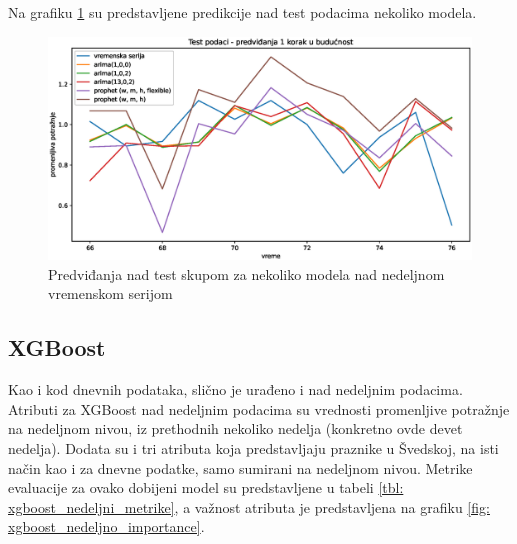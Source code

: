 \documentclass[12pt,oneside]{memoir}
\begin{document}
Na grafiku \ref{fig: nedeljni_test} su predstavljene predikcije nad test podacima nekoliko modela.
\begin{figure}[!ht]
  \centering
  \includegraphics[width=1\textwidth]{./grafici/test_nedeljni_modeli.eps}
  \caption{Predviđanja nad test skupom za nekoliko modela nad nedeljnom vremenskom serijom}
  \label{fig: nedeljni_test}
\end{figure}

\subsection{XGBoost}
Kao i kod dnevnih podataka, slično je urađeno i nad nedeljnim podacima. Atributi za XGBoost nad nedeljnim podacima su vrednosti promenljive potražnje na nedeljnom nivou, iz prethodnih nekoliko nedelja (konkretno ovde devet nedelja). Dodata su i tri atributa koja predstavljaju praznike u Švedskoj, na isti način kao i za dnevne podatke, samo sumirani na nedeljnom nivou. Metrike evaluacije za ovako dobijeni model su predstavljene u tabeli \ref{tbl: xgboost_nedeljni_metrike}, a važnost atributa je predstavljena na grafiku \ref{fig: xgboost_nedeljno_importance}.
\end{document}

